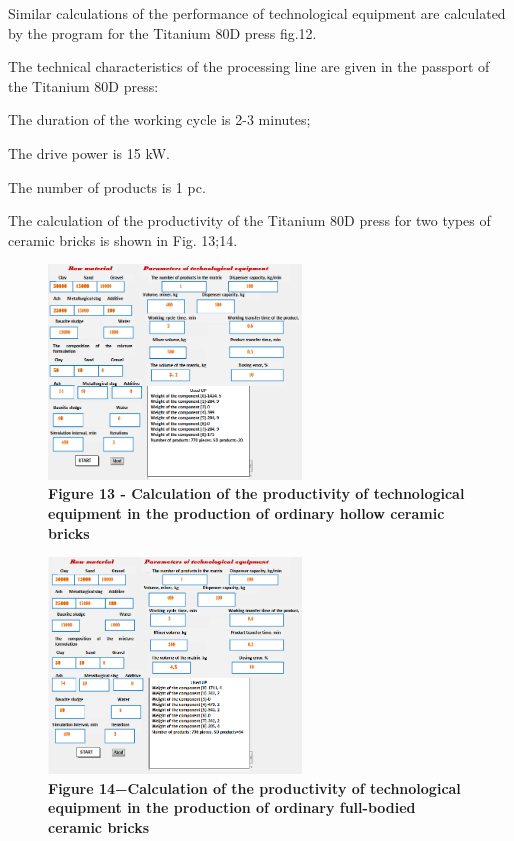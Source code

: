 \begin{multicols}{2}


Similar calculations of the performance of technological equipment are
calculated by the program for the Titanium 80D press fig.12.

The technical characteristics of the processing line are given in the
passport of the Titanium 80D press:

The duration of the working cycle is 2-3 minutes;

The drive power is 15 kW.

The number of products is 1 pc.

The calculation of the productivity of the Titanium 80D press for two
types of ceramic bricks is shown in Fig. 13;14.
\end{multicols}

\begin{figure}[H]
	\centering
	\includegraphics[width=0.6\textwidth]{assets/279}
	\caption*{\bfseries Figure 13 - Calculation of the productivity of technological
	equipment in the production  of ordinary hollow ceramic bricks}
\end{figure}



\begin{figure}[H]
	\centering
	\includegraphics[width=0.6\textwidth]{assets/280}
	\caption*{\bfseries Figure 14−Calculation of the productivity of technological
	equipment in the production of ordinary full-bodied ceramic bricks}
\end{figure}

